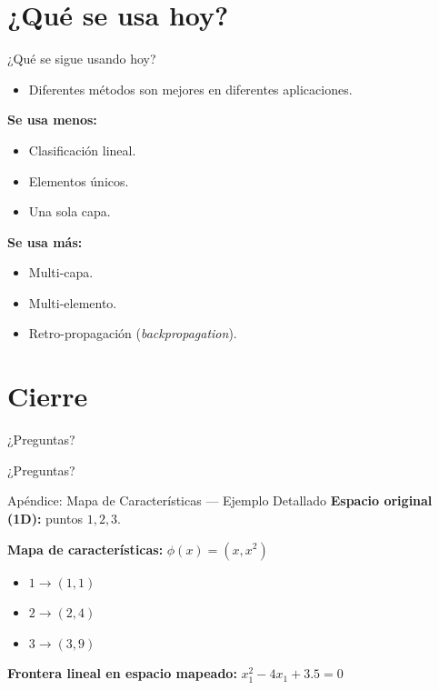 \documentclass[aspectratio=169,utf8,spanish]{beamer}
\begin{document}
\section{¿Qué se usa hoy?}

\begin{frame}{¿Qué se sigue usando hoy?}
  \begin{itemize}
    \item Diferentes métodos son mejores en diferentes aplicaciones.
  \end{itemize}

  \textbf{Se usa menos:}
  \begin{itemize}
    \item Clasificación lineal.
    \item Elementos únicos.
    \item Una sola capa.
  \end{itemize}

  \textbf{Se usa más:}
  \begin{itemize}
    \item Multi-capa.
    \item Multi-elemento.
    \item Retro-propagación (\textit{backpropagation}).
  \end{itemize}
\end{frame}

\section{Cierre}

\begin{frame}{¿Preguntas?}
  \begin{center}
    \Large ¿Preguntas?
  \end{center}
\end{frame}

\appendix

\begin{frame}{Apéndice: Mapa de Características — Ejemplo Detallado}
  \textbf{Espacio original (1D):} puntos $1, 2, 3$.
  \bigskip

  \textbf{Mapa de características:} $\phi(x) = (x, x^2)$
  \begin{itemize}
    \item $1 \to (1, 1)$
    \item $2 \to (2, 4)$
    \item $3 \to (3, 9)$
  \end{itemize}

  \textbf{Frontera lineal en espacio mapeado:}
  $x_1^2 - 4x_1 + 3.5 = 0$
\end{frame}
\end{document}
